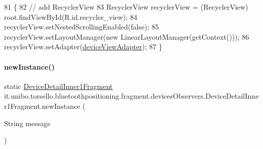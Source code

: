 \begin{DoxyCode}
81                                                    \{
82         \textcolor{comment}{// add RecyclerView}
83         RecyclerView recyclerView = (RecyclerView) root.findViewById(R.id.recycler\_view);
84         recyclerView.setNestedScrollingEnabled(\textcolor{keyword}{false});
85         recyclerView.setLayoutManager(\textcolor{keyword}{new} LinearLayoutManager(getContext()));
86         recyclerView.setAdapter(\hyperlink{classit_1_1unibo_1_1torsello_1_1bluetoothpositioning_1_1fragment_1_1devicesObservers_1_1DeviceDetailInner1Fragment_a981ec49aae98052b414864feb742cbc5_a981ec49aae98052b414864feb742cbc5}{deviceViewAdapter});
87     \}
\end{DoxyCode}
\hypertarget{classit_1_1unibo_1_1torsello_1_1bluetoothpositioning_1_1fragment_1_1devicesObservers_1_1DeviceDetailInner1Fragment_ac6fb79b1fec7580e8b96b414bfccd4d6_ac6fb79b1fec7580e8b96b414bfccd4d6}{}\label{classit_1_1unibo_1_1torsello_1_1bluetoothpositioning_1_1fragment_1_1devicesObservers_1_1DeviceDetailInner1Fragment_ac6fb79b1fec7580e8b96b414bfccd4d6_ac6fb79b1fec7580e8b96b414bfccd4d6} 
\paragraph{\texorpdfstring{new\+Instance()}{newInstance()}}
{\footnotesize\ttfamily static \hyperlink{classit_1_1unibo_1_1torsello_1_1bluetoothpositioning_1_1fragment_1_1devicesObservers_1_1DeviceDetailInner1Fragment}{Device\+Detail\+Inner1\+Fragment} it.\+unibo.\+torsello.\+bluetoothpositioning.\+fragment.\+devices\+Observers.\+Device\+Detail\+Inner1\+Fragment.\+new\+Instance (\begin{DoxyParamCaption}\item[{String}]{message }\end{DoxyParamCaption})\hspace{0.3cm}{\ttfamily [static]}}


